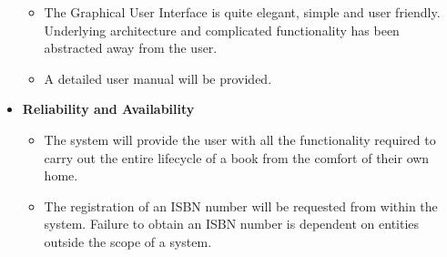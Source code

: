 \begin{itemize}
\begin{itemize}
		\item The Graphical User Interface is quite elegant, simple and user friendly. Underlying architecture and complicated functionality has been abstracted away from the user.
		\item A detailed user manual will be provided.
	\end{itemize}
	\item \textbf{Reliability and Availability}
	\begin{itemize}
		\item The system will provide the user with all the functionality required to carry out the entire lifecycle of a book from the comfort of their own home.
		\item The registration of an ISBN number will be requested from within the system. Failure to obtain an ISBN number is dependent on entities outside the scope of a system.
	\end{itemize}
\end{itemize}


%
